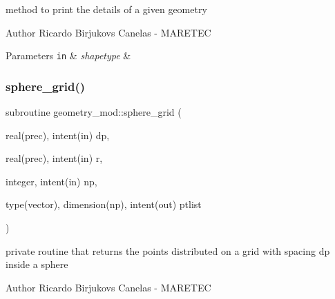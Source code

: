 method to print the details of a given geometry 

\begin{DoxyAuthor}{Author}
Ricardo Birjukovs Canelas -\/ M\+A\+R\+E\+T\+EC 
\end{DoxyAuthor}

\begin{DoxyParams}[1]{Parameters}
\mbox{\tt in}  & {\em shapetype} & \\
\hline
\end{DoxyParams}
\mbox{\label{namespacegeometry__mod_a6c03a4ea3de6763940396dbeb3908ebc}} 
\subsubsection{\texorpdfstring{sphere\+\_\+grid()}{sphere\_grid()}}
{\footnotesize\ttfamily subroutine geometry\+\_\+mod\+::sphere\+\_\+grid (\begin{DoxyParamCaption}\item[{real(prec), intent(in)}]{dp,  }\item[{real(prec), intent(in)}]{r,  }\item[{integer, intent(in)}]{np,  }\item[{type(vector), dimension(np), intent(out)}]{ptlist }\end{DoxyParamCaption})\hspace{0.3cm}{\ttfamily [private]}}



private routine that returns the points distributed on a grid with spacing dp inside a sphere 

\begin{DoxyAuthor}{Author}
Ricardo Birjukovs Canelas -\/ M\+A\+R\+E\+T\+EC 
\end{DoxyAuthor}

